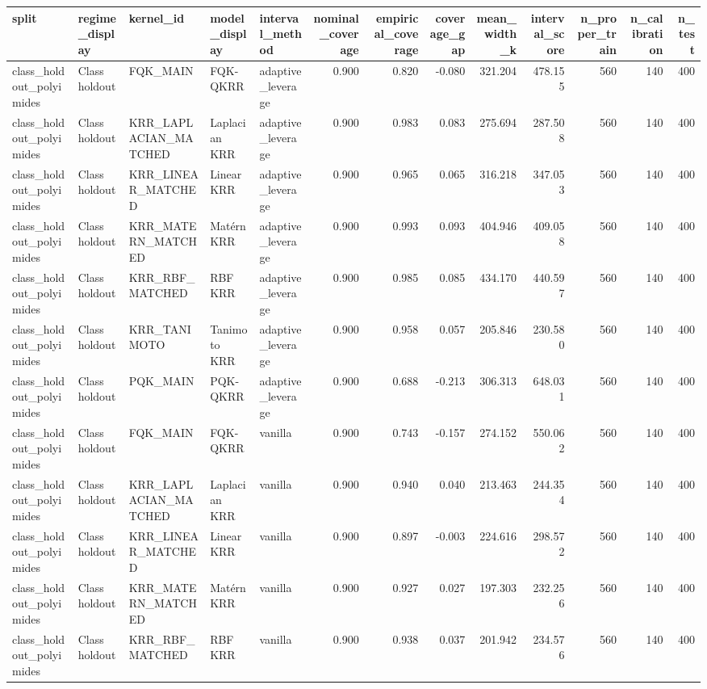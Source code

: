 \begin{tabular}{lllllrrrrrrrr}
\toprule
split & regime\_display & kernel\_id & model\_display & interval\_method & nominal\_coverage & empirical\_coverage & coverage\_gap & mean\_width\_k & interval\_score & n\_proper\_train & n\_calibration & n\_test \\
\midrule
class\_holdout\_polyimides & Class holdout & FQK\_MAIN & FQK-QKRR & adaptive\_leverage & 0.900 & 0.820 & -0.080 & 321.204 & 478.155 & 560 & 140 & 400 \\
class\_holdout\_polyimides & Class holdout & KRR\_LAPLACIAN\_MATCHED & Laplacian KRR & adaptive\_leverage & 0.900 & 0.983 & 0.083 & 275.694 & 287.508 & 560 & 140 & 400 \\
class\_holdout\_polyimides & Class holdout & KRR\_LINEAR\_MATCHED & Linear KRR & adaptive\_leverage & 0.900 & 0.965 & 0.065 & 316.218 & 347.053 & 560 & 140 & 400 \\
class\_holdout\_polyimides & Class holdout & KRR\_MATERN\_MATCHED & Matérn KRR & adaptive\_leverage & 0.900 & 0.993 & 0.093 & 404.946 & 409.058 & 560 & 140 & 400 \\
class\_holdout\_polyimides & Class holdout & KRR\_RBF\_MATCHED & RBF KRR & adaptive\_leverage & 0.900 & 0.985 & 0.085 & 434.170 & 440.597 & 560 & 140 & 400 \\
class\_holdout\_polyimides & Class holdout & KRR\_TANIMOTO & Tanimoto KRR & adaptive\_leverage & 0.900 & 0.958 & 0.057 & 205.846 & 230.580 & 560 & 140 & 400 \\
class\_holdout\_polyimides & Class holdout & PQK\_MAIN & PQK-QKRR & adaptive\_leverage & 0.900 & 0.688 & -0.213 & 306.313 & 648.031 & 560 & 140 & 400 \\
class\_holdout\_polyimides & Class holdout & FQK\_MAIN & FQK-QKRR & vanilla & 0.900 & 0.743 & -0.157 & 274.152 & 550.062 & 560 & 140 & 400 \\
class\_holdout\_polyimides & Class holdout & KRR\_LAPLACIAN\_MATCHED & Laplacian KRR & vanilla & 0.900 & 0.940 & 0.040 & 213.463 & 244.354 & 560 & 140 & 400 \\
class\_holdout\_polyimides & Class holdout & KRR\_LINEAR\_MATCHED & Linear KRR & vanilla & 0.900 & 0.897 & -0.003 & 224.616 & 298.572 & 560 & 140 & 400 \\
class\_holdout\_polyimides & Class holdout & KRR\_MATERN\_MATCHED & Matérn KRR & vanilla & 0.900 & 0.927 & 0.027 & 197.303 & 232.256 & 560 & 140 & 400 \\
class\_holdout\_polyimides & Class holdout & KRR\_RBF\_MATCHED & RBF KRR & vanilla & 0.900 & 0.938 & 0.037 & 201.942 & 234.576 & 560 & 140 & 400 \\

\end{tabular}
